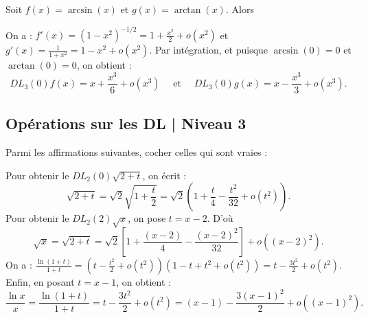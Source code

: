 \begin{question}
Soit $\displaystyle f(x)=\arcsin (x)$ et $\displaystyle g(x)=\arctan (x)$. Alors
\begin{answers}  
\end{answers}
\begin{explanations}
On a : $\displaystyle f'(x)=(1-x^2)^{-1/2}=1+\frac{x^2}{2}+o(x^2)$ et $\displaystyle g'(x)=\frac{1}{1+x^2}=1-x^2+o(x^2)$. Par intégration, et puisque $\arcsin (0)=0$ et $\arctan (0)=0$, on obtient :
$$DL_3(0)f(x)=x+\frac{x^3}{6}+o(x^3)\quad \mbox{ et }\quad DL_3(0)g(x)=x-\frac{x^3}{3}+o(x^3).$$
\end{explanations}
\end{question}

\subsection{Opérations sur les DL | Niveau 3}

\begin{question}
Parmi les affirmations suivantes, cocher celles qui sont vraies :
\begin{answers}  
\end{answers}
\vskip2mm
\begin{explanations}
Pour obtenir le $DL_2(0)\sqrt{2+t}$, on écrit : 
$$\displaystyle \sqrt{2+t}=\sqrt{2}\sqrt{1+\frac{t}{2}}=\sqrt{2}\left(1+\frac{t}{4}-\frac{t^2}{32}+o(t^2)\right).$$
Pour obtenir le $DL_2(2)\sqrt{x}$, on pose $t=x-2$. D'où
$$\sqrt{x}=\sqrt{2+t}=\sqrt{2}\left[1+\frac{(x-2)}{4}-\frac{(x-2)^2}{32}\right]+o((x-2)^2).$$
On a : $\displaystyle \frac{\ln (1+t)}{1+t}=\left(t-\frac{t^2}{2}+o(t^2)\right)\left(1-t+t^2+o(t^2)\right)=t-\frac{3t^2}{2}+o(t^2)$.
Enfin, en posant $t=x-1$, on obtient :
$$\frac{\ln x}{x}=\frac{\ln (1+t)}{1+t}=t-\frac{3t^2}{2}+o(t^2)=(x-1)-\frac{3(x-1)^2}{2}+o((x-1)^2).$$
\end{explanations}
\end{question}

